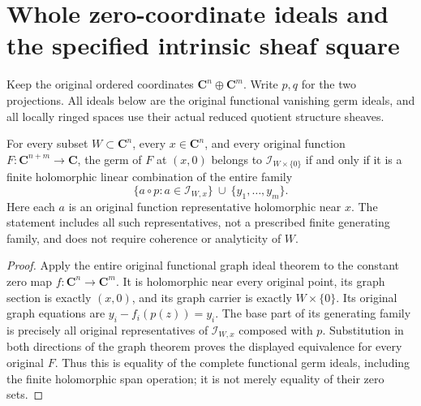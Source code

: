 \section{Whole zero-coordinate ideals and the specified intrinsic sheaf square}

Keep the original ordered coordinates $\mathbf C^n\oplus\mathbf C^m$.
Write $p,q$ for the two projections. All ideals below are the original
functional vanishing germ ideals, and all locally ringed spaces use their
actual reduced quotient structure sheaves.

\begin{lemma}
\label{hir:actual-zero-coordinate-whole-functional-ideal}
\leanok
For every subset $W\subset\mathbf C^n$, every $x\in\mathbf C^n$, and
every original function $F:\mathbf C^{n+m}\to\mathbf C$, the germ of $F$
at $(x,0)$ belongs to $\mathcal I_{W\times\{0\}}$ if and only if it is a
finite holomorphic linear combination of the entire family
\[
 \{a\circ p:a\in\mathcal I_{W,x}\}\ \cup\ \{y_1,\ldots,y_m\}.
\]
Here each $a$ is an original function representative holomorphic near $x$.
The statement includes all such representatives, not a prescribed finite
generating family, and does not require coherence or analyticity of $W$.
\end{lemma}
\begin{proof}
Apply the entire original functional graph ideal theorem to the constant
zero map $f:\mathbf C^n\to\mathbf C^m$. It is holomorphic near every
original point, its graph section is exactly $(x,0)$, and its graph carrier
is exactly $W\times\{0\}$. Its original graph equations are
$y_i-f_i(p(z))=y_i$. The base part of its generating family is precisely
all original representatives of $\mathcal I_{W,x}$ composed with $p$.
Substitution in both directions of the graph theorem proves the displayed
equivalence for every original $F$. Thus this is equality of the complete
functional germ ideals, including the finite holomorphic span operation;
it is not merely equality of their zero sets.
\end{proof}


